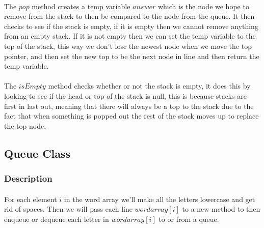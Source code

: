 \documentclass[letterpaper, 10pt,DIV=13]{scrartcl}
\numberwithin{equation}{section} %
\numberwithin{figure}{section} %
\numberwithin{table}{section} %
\begin{document}
\paragraph{} The $pop$ method creates a temp variable $answer$ which is the node we hope to remove from the stack to then be compared to the node from the queue. It then checks to see if the stack is empty, if it is empty then we cannot remove anything from an empty stack. If it is not empty then we can set the temp variable to the top of the stack, this way we don't lose the newest node when we move the top pointer, and then set the new top to be the next node in line and then return the temp variable. 
\paragraph{} The $isEmpty$ method checks whether or not the stack is empty, it does this by looking to see if the head or top of the stack is null, this is because stacks are first in last out, meaning that there will always be a top to the stack due to the fact that when something is popped out the rest of the stack moves up to replace the top node.

\subsection{Queue Class}

\subsubsection{Description}
\paragraph{} For each element $i$ in the word array we'll make all the letters lowercase and get rid of spaces. Then we will pass each line $wordarray[i]$ to a new method to then enqueue or dequeue each letter in $wordarray[i]$ to or from a queue.
\end{document}
